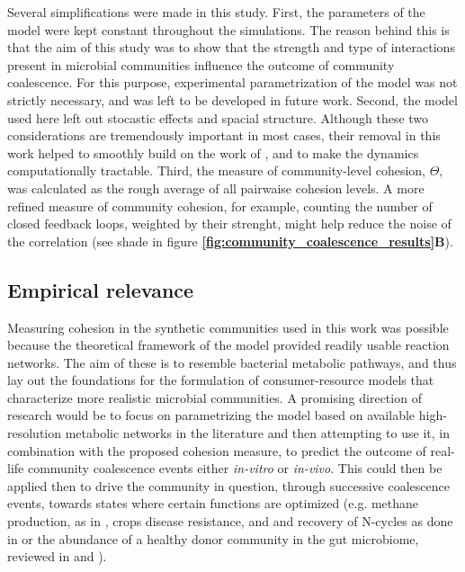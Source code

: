 \documentclass[titlepage,11pt]{article}
\begin{document}
\begin{linenumbers}
\begin{singlespace}
			Several simplifications were made in this study. First, the parameters of the model were kept constant throughout the simulations. The reason behind this is that the aim of this study was to show that the strength and type of interactions present in microbial communities influence the outcome of community coalescence. For this purpose, experimental parametrization of the model was not strictly necessary, and was left to be developed in future work. Second, the model used here left out stocastic effects and spacial structure. Although these two considerations are tremendously important in most cases, their removal in this work helped to smoothly build on the work of \citet{Tikhonov2016}, and to make the dynamics computationally tractable. Third, the measure of community-level cohesion, $ \Theta $, was  calculated as the rough average of all pairwaise cohesion levels. A more refined measure of community cohesion, for example, counting the number of closed feedback loops, weighted by their strenght,  might help reduce the noise of the correlation (see shade in figure \textbf{\ref{fig:community_coalescence_results}B}). %
			\subsection{Empirical relevance}
				Measuring cohesion in the synthetic communities used in this work was possible because the theoretical framework of the model provided readily usable reaction networks. The aim of these is to resemble bacterial metabolic pathways, and thus lay out the foundations for the formulation of consumer-resource models that characterize more realistic microbial communities. A promising direction of research would be to focus on parametrizing the model based on available high-resolution metabolic networks in the literature and then attempting to use it, in combination with the proposed cohesion measure, to predict the outcome of real-life community coalescence events either \textit{in-vitro} or \textit{in-vivo}. This could then be applied then to drive the community in question, through successive coalescence events, towards states where certain functions are optimized (e.g. methane production, as in \citet{Rillig2016}, crops disease resistance, and and recovery of N-cycles as done in \citet{Calderon2017} or the abundance of a healthy donor community in the gut microbiome, reviewed in \citet{Wilson2019} and \citet{Wang2019}). 
	

\end{singlespace}
\end{linenumbers}
\end{document}
